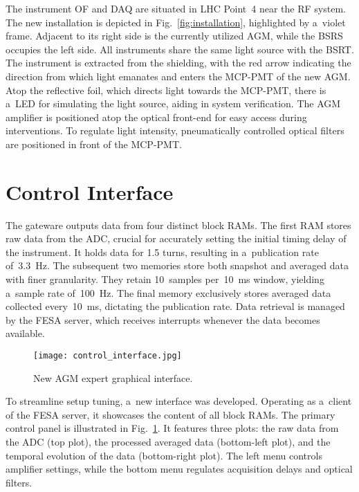 The instrument OF and DAQ are situated in LHC Point~4 near the RF system. The
new installation is depicted in Fig.~\ref{fig:installation}, highlighted by a~violet frame. Adjacent to its right side is the currently utilized AGM, while
the BSRS occupies the left side. All instruments share the same light source
with the BSRT. The instrument is extracted from the shielding, with the red
arrow indicating the direction from which light emanates and enters the MCP-PMT of the new AGM.
Atop the reflective foil, which directs light towards the MCP-PMT, there is a~LED for simulating the light source, aiding in system verification. The
AGM amplifier is positioned atop the optical front-end for easy access during
interventions. To regulate light intensity, pneumatically controlled optical
filters are positioned in front of the MCP-PMT.

\section{Control Interface}
The gateware outputs data from four distinct block RAMs. The first RAM stores
raw data from the ADC, crucial for accurately setting the initial timing delay
of the instrument. It holds data for 1.5 turns, resulting in a~publication rate
of~\SI{3.3}{Hz}. The subsequent two memories store both snapshot and averaged
data with finer granularity. They retain 10~samples per~\SI{10}{ms} window,
yielding a~sample rate of~\SI{100}{Hz}. The final memory exclusively stores
averaged data collected every~\SI{10}{ms}, dictating the publication rate. Data
retrieval is managed by the FESA server, which receives interrupts whenever the
data becomes available.
\begin{figure}[!tbh]
    \centering
    \texttt{[image: control\_interface.jpg]}
    \caption{New AGM expert graphical interface.}
    \label{fig:control_interface}
\end{figure}
To streamline setup tuning, a~new interface was developed. Operating as a~client of the FESA server, it showcases the content of all block RAMs. The
primary control panel is illustrated in Fig.~\ref{fig:control_interface}. It
features three plots: the raw data from the ADC (top plot), the processed averaged data
(bottom-left plot), and the temporal evolution of the data (bottom-right plot).
The left menu controls amplifier settings, while the bottom menu regulates
acquisition delays and optical filters.

